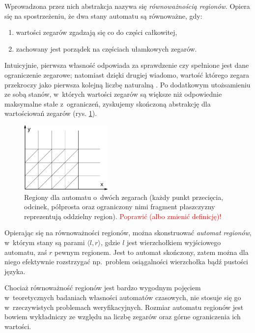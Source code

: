 \documentclass{pracamgr}
\newcommand{\todo}[1]{\textcolor{red}{#1}}
\newcommand{\pair}[2]{\langle #1, #2 \rangle}
\theoremstyle{plain}
\begin{document}
Wprowadzona przez nich abstrakcja nazywa się \emph{równoważnością
  regionów}. Opiera się na spostrzeżeniu, że dwa stany automatu są
równoważne, gdy:
\begin{samepage}
\begin{enumerate}
  \item wartości zegarów zgadzają się co do części całkowitej,
  \item zachowany jest porządek na częściach ułamkowych zegarów.
\end{enumerate}
\end{samepage}
Intuicyjnie, pierwsza własność odpowiada za sprawdzenie czy spełnione
jest dane ograniczenie zegarowe; natomiast dzięki drugiej wiadomo,
wartość którego zegara przekroczy jako pierwsza kolejną liczbę
naturalną \cite{am:decision}. Po dodatkowym utożsamieniu ze sobą stanów,
w~których wartości zegarów są większe niż odpowiednie maksymalne stałe
z~ograniczeń, zyskujemy skończoną abstrakcję dla wartościowań zegarów
(rys. \ref{img:regions}).
\begin{figure}
  \centering
  \includegraphics[width=0.4\textwidth]{img/ta-regions}
  \caption{Regiony dla automatu o~dwóch zegarach (każdy punkt
    przecięcia, odcinek, półprosta oraz ograniczony nimi fragment
    płaszczyzny reprezentują oddzielny region). \todo{Poprawić (albo
      zmienić definicję)!}}
  \label{img:regions}
\end{figure}

Opierając się na równoważności regionów, można skonstruować
\emph{automat regionów}, w~którym stany są parami $\pair{l}{r}$, gdzie
$l$ jest wierzchołkiem wyjściowego automatu, zaś $r$ pewnym
regionem. Jest to automat skończony, zatem można dla niego efektywnie
rozstrzygać np.~problem osiągalności wierzchołka bądź pustości języka.

Chociaż równoważność regionów jest bardzo wygodnym pojęciem
w~teoretycznych badaniach własności automatów czasowych, nie stosuje się
go w~rzeczywistych problemach weryfikacyjnych. Rozmiar automatu
regionów jest bowiem wykładniczy ze względu na liczbę zegarów oraz
górne ograniczenia ich wartości.
\end{document}
